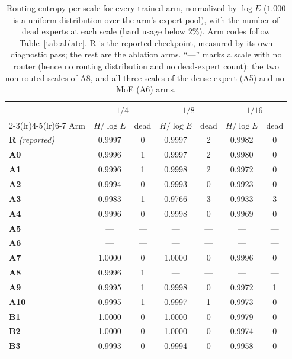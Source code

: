 \documentclass[10pt,a4paper,twocolumn,twoside]{article}
\begin{document}
\begin{table}[!t]
\centering
\caption{Routing entropy per scale for every trained arm, normalized by $\log E$
($1.000$ is a uniform distribution over the arm's expert pool), with the number of dead
experts at each scale (hard usage below $2\%$). Arm codes follow
Table~\ref{tab:ablate}. R is the reported checkpoint, measured by its own diagnostic
pass; the rest are the ablation arms. ``---'' marks a scale with no router (hence no routing
distribution and no dead-expert count): the two non-routed scales of A8, and all three scales of
the dense-expert (A5) and no-MoE (A6) arms.}
\label{tab:diag}
\scriptsize
\setlength{\tabcolsep}{2.6pt}
\begin{tabular}{@{}lcccccc@{}}
\toprule
& \multicolumn{2}{c}{$1/4$} & \multicolumn{2}{c}{$1/8$} & \multicolumn{2}{c}{$1/16$} \\
\cmidrule(lr){2-3}\cmidrule(lr){4-5}\cmidrule(lr){6-7}
Arm & $H/\log E$ & dead & $H/\log E$ & dead & $H/\log E$ & dead \\
\midrule
\textbf{R} \textit{(reported)} & 0.9997 & 0 & 0.9997 & 2 & 0.9982 & 0 \\
\textbf{A0} & 0.9996 & 1 & 0.9997 & 2 & 0.9980 & 0 \\
\textbf{A1} & 0.9996 & 1 & 0.9998 & 2 & 0.9972 & 0 \\
\textbf{A2} & 0.9994 & 0 & 0.9993 & 0 & 0.9923 & 0 \\
\textbf{A3} & 0.9983 & 1 & 0.9766 & 3 & 0.9933 & 3 \\
\textbf{A4} & 0.9996 & 0 & 0.9998 & 0 & 0.9969 & 0 \\
\textbf{A5} & --- & --- & --- & --- & --- & --- \\
\textbf{A6} & --- & --- & --- & --- & --- & --- \\
\textbf{A7} & 1.0000 & 0 & 1.0000 & 0 & 0.9996 & 0 \\
\textbf{A8} & 0.9996 & 1 & --- & --- & --- & --- \\
\textbf{A9} & 0.9995 & 1 & 0.9998 & 0 & 0.9972 & 1 \\
\textbf{A10} & 0.9995 & 1 & 0.9997 & 1 & 0.9973 & 0 \\
\textbf{B1} & 1.0000 & 0 & 1.0000 & 0 & 0.9979 & 0 \\
\textbf{B2} & 1.0000 & 0 & 1.0000 & 0 & 0.9974 & 0 \\
\textbf{B3} & 0.9993 & 0 & 0.9994 & 0 & 0.9958 & 0 \\
\bottomrule
\end{tabular}
\end{table}
\end{document}
